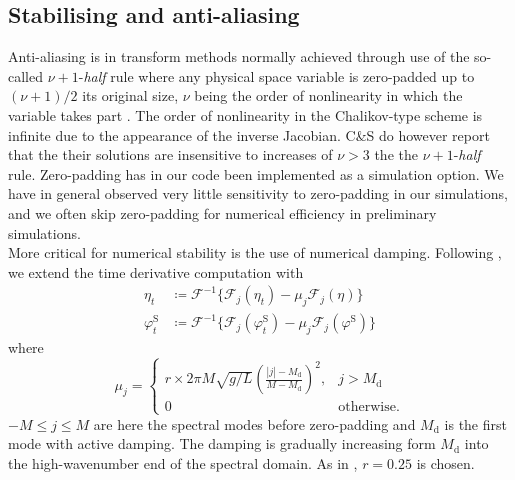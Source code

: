 \documentclass[a4paper,12pt]{article}
\newcommand{\mr}{\mathrm}
\newcommand{\mc}{\mathcal}
\renewcommand{\S}{^\mr{S}}
\renewcommand{\_}[1]{_\mr{#1}}
\newcommand{\rbr}[1]{\left(#1\right)}
\newcommand{\refCS}{C\&S}
\newcommand{\FF}{\mc F}
\begin{document}
\subsection*{Stabilising and anti-aliasing}
Anti-aliasing is in transform methods \citep{orszag1970transform} normally achieved through use of the so-called $\nu+1$-\textit{half} rule where any physical space variable is zero-padded up to $(\nu+1)/2$ its original size, $\nu$ being the order of nonlinearity in which the variable takes part \citep{bonnefoy2010}.
The order of nonlinearity in the Chalikov-type scheme is infinite due to the appearance of the inverse Jacobian. \refCS{} do however report that the their solutions are insensitive to increases of $\nu>3$ the the $\nu+1$-\textit{half} rule.
Zero-padding has in our code been implemented as a simulation option.
We have in general observed very little sensitivity to zero-padding in our simulations, and we often skip zero-padding for numerical efficiency in preliminary simulations.
\\


More critical for numerical stability is the use of numerical damping.
Following \citet{chalikov2005modeling}, we extend the time derivative computation with
\begin{subequations}
\begin{align}
\eta_t &\coloneqq \FF^{-1}\{\FF_j(\eta_t) - \mu_j \FF_j(\eta) \}\\
\varphi\S_t &\coloneqq  \FF^{-1}\{\FF_j(\varphi\S_t) - \mu_j \FF_j(\varphi\S) \}
\end{align}%
\label{eq:damping}%
\end{subequations}
where 
\begin{equation}
\mu_j = \begin{cases}
r\times 2\pi M \sqrt{g/L}\rbr{\frac{|j|-M\_d}{M-M\_d}}^2,& j>M\_d\\
0 & \text{otherwise.}
\end{cases}
\label{eq:damping_nu}
\end{equation}
$-M\leq j \leq M$ are here the spectral modes before zero-padding and $M\_d$ is the first mode with active damping.
The damping is gradually increasing form $M\_d$ into the high-wavenumber end of the spectral domain.
As in \citet{chalikov2005modeling}, $r=0.25$ is chosen.
\end{document}
